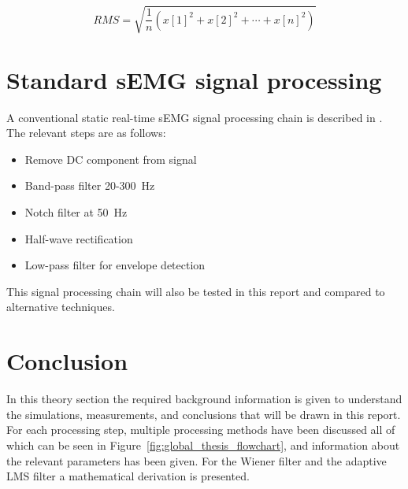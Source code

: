 \begin{equation}
    RMS = \sqrt{\frac{1}{n} (x[1]^2 + x[2]^2 + \cdots + x[n]^2)}
    \label{eq:rms}
\end{equation}

\section{Standard sEMG signal processing}\label{section:standard_semg_processing}
A conventional static real-time sEMG signal processing chain is described in \cite{muscle_force_estimation}. The relevant steps are as follows:
\begin{itemize}
    \item Remove DC component from signal
    \item Band-pass filter 20-\SI{300}{\hertz}
    \item Notch filter at \SI{50}{\hertz}
    \item Half-wave rectification
    \item Low-pass filter for envelope detection
\end{itemize}

This signal processing chain will also be tested in this report and compared to alternative techniques.

\section{Conclusion}
In this theory section the required background information is given to understand the simulations, measurements, and conclusions that will be drawn in this report. For each processing step, multiple processing methods have been discussed all of which can be seen in Figure~\ref{fig:global_thesis_flowchart}, and information about the relevant parameters has been given. For the Wiener filter and the adaptive LMS filter a mathematical derivation is presented.